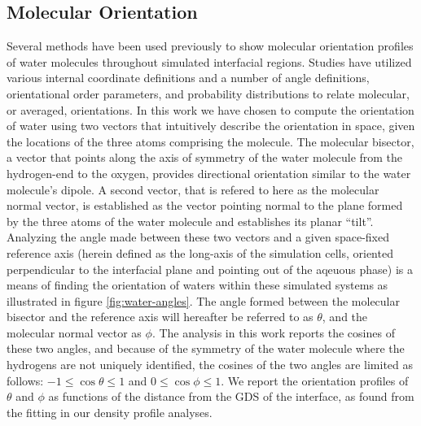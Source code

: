 %


\subsection{Molecular Orientation}
Several methods have been used previously to show molecular orientation profiles of water molecules throughout simulated interfacial regions.\cite{Wick2006c,Thomas2007,Wick2008a,Wick2007,Fan2009,Galamba2008,Ishiyama2007,Hore2007,Hore2008} Studies have utilized various internal coordinate definitions and a number of angle definitions, orientational order parameters, and probability distributions to relate molecular, or averaged, orientations. In this work we have chosen to compute the orientation of water using two vectors that intuitively describe the orientation in space, given the locations of the three atoms comprising the molecule. The molecular bisector, a vector that points along the axis of symmetry of the water molecule from the hydrogen-end to the oxygen, provides directional orientation similar to the water molecule's dipole. A second vector, that is refered to here as the molecular normal vector, is established as the vector pointing normal to the plane formed by the three atoms of the water molecule and establishes its planar ``tilt''. Analyzing the angle made between these two vectors and a given space-fixed reference axis (herein defined as the long-axis of the simulation cells, oriented perpendicular to the interfacial plane and pointing out of the aqeuous phase) is a means of finding the orientation of waters within these simulated systems as illustrated in figure \ref{fig:water-angles}. The angle formed between the molecular bisector and the reference axis will hereafter be referred to as $\theta$, and the molecular normal vector as $\phi$. The analysis in this work reports the cosines of these two angles, and because of the symmetry of the water molecule where the hydrogens are not uniquely identified, the cosines of the two angles are limited as follows: $-1\le\cos\theta\le1$ and $0\le\cos\phi\le1$. We report the orientation profiles of $\theta$ and $\phi$ as functions of the distance from the GDS of the interface, as found from the fitting in our density profile analyses.

